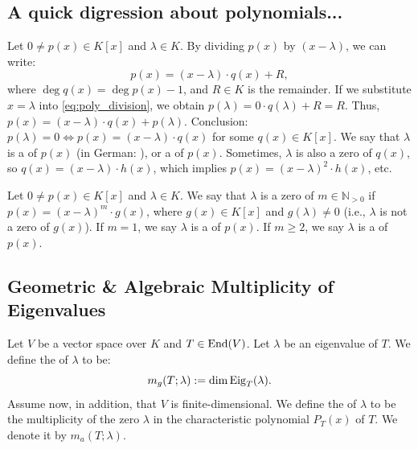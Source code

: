 \subsection{A quick digression about polynomials...}
Let $0 \ne p(x) \in K[x]$ and $\lambda \in K$. By dividing $p(x)$ by $(x-\lambda)$, we can write:
\begin{equation} \label{eq:poly_division}
  p(x) = (x-\lambda) \cdot q(x) + R,
\end{equation}
where $\deg q(x) = \deg p(x) - 1$, and $R \in K$ is the remainder.
If we substitute $x = \lambda$ into \eqref{eq:poly_division}, we obtain $p(\lambda) = 0 \cdot q(\lambda) + R = R$. Thus, $p(x) = (x-\lambda) \cdot q(x) + p(\lambda)$.
Conclusion: $p(\lambda) = 0 \iff p(x) = (x-\lambda) \cdot q(x)$ for some $q(x) \in K[x]$.
We say that $\lambda$ is a  of $p(x)$ (in German: ), or a  of $p(x)$.
Sometimes, $\lambda$ is also a zero of $q(x)$, so $q(x) = (x-\lambda) \cdot h(x)$, which implies $p(x) = (x-\lambda)^2 \cdot h(x)$, etc.

\begin{definition}
  \label{def:mult_zero}
  Let $0 \ne p(x) \in K[x]$ and $\lambda \in K$. We say that $\lambda$ is a zero of  $m \in \mathbb{N}_{>0}$ if $p(x) = (x-\lambda)^m \cdot g(x)$, where $g(x) \in K[x]$ and $g(\lambda) \ne 0$ (i.e., $\lambda$ is not a zero of $g(x)$).
  If $m=1$, we say $\lambda$ is a  of $p(x)$.
  If $m \ge 2$, we say $\lambda$ is a  of $p(x)$.
\end{definition}

\subsection{Geometric \& Algebraic Multiplicity of Eigenvalues}

\begin{definition}
  \label{def:geom_alg_mult}
  Let $V$ be a vector space over $K$ and $T \in \operatorname{End}(V)$. Let $\lambda$ be an eigenvalue of $T$. We define the  of $\lambda$ to be:
  \[ m_g(T;\lambda) := \dim \operatorname{Eig}_T(\lambda). \]
  Assume now, in addition, that $V$ is finite-di\-men\-sional. We define the  of $\lambda$ to be the multiplicity of the zero $\lambda$ in the characteristic polynomial $P_T(x)$ of $T$. We denote it by $m_a(T;\lambda)$.
\end{definition}

